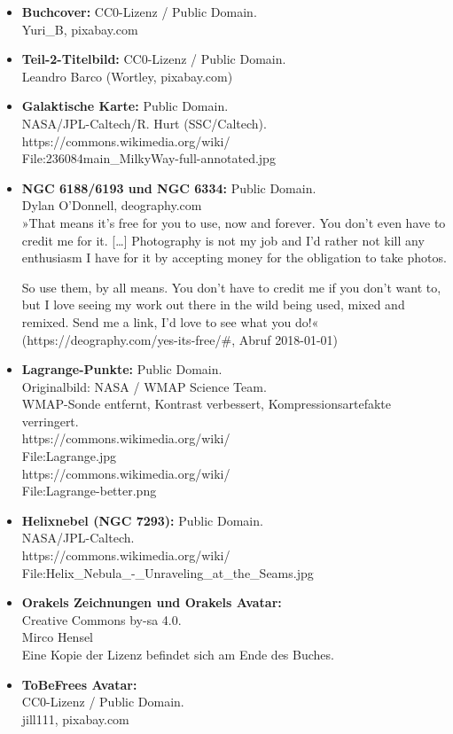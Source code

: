 \begin{itemize}
    \item \textbf{Buchcover:} CC0-Lizenz / Public Domain.\\ Yuri\_B, pixabay.com
    \item \textbf{Teil-2-Titelbild:} CC0-Lizenz / Public Domain.\\ Leandro Barco (Wortley, pixabay.com)
    \item \textbf{Galaktische Karte:} Public Domain.\\ NASA/JPL-Caltech/R. Hurt (SSC/Caltech).\\ https://commons.wikimedia.org/wiki/\\File:236084main\_MilkyWay-full-annotated.jpg
    \item \textbf{NGC 6188/6193 und NGC 6334:} Public Domain.\\ Dylan O'Donnell, deography.com\\ »That means it’s free for you to use, now and forever. You don’t even have to credit me for it. […] Photography is not my job and I’d rather not kill any enthusiasm I have for it by accepting money for the obligation to take photos.

So use them, by all means. You don’t have to credit me if you don’t want to, but I love seeing my work out there in the wild being used, mixed and remixed. Send me a link, I’d love to see what you do!« (https://deography.com/yes-its-free/\#, Abruf 2018-01-01)
    \item \textbf{Lagrange-Punkte:} Public Domain.\\ Originalbild: NASA / WMAP Science Team.\\ WMAP-Sonde entfernt, Kontrast verbessert, Kompressionsartefakte verringert.\\ https://commons.wikimedia.org/wiki/\\File:Lagrange.jpg\\ https://commons.wikimedia.org/wiki/\\File:Lagrange-better.png
    \item \textbf{Helixnebel (NGC 7293):} Public Domain.\\ NASA/JPL-Caltech.\\ https://commons.wikimedia.org/wiki/\\File:Helix\_Nebula\_-\_Unraveling\_at\_the\_Seams.jpg
    \item \textbf{Orakels Zeichnungen und Orakels Avatar:}\\ Creative Commons by-sa 4.0.\\ Mirco Hensel\\Eine Kopie der Lizenz befindet sich am Ende des Buches.
    \item \textbf{ToBeFrees Avatar:}\\ CC0-Lizenz / Public Domain.\\ jill111, pixabay.com
\end{itemize}

